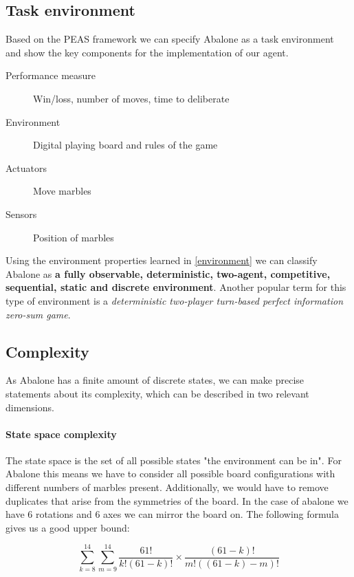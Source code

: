 \subsection{Task environment}
Based on the PEAS framework we can specify Abalone as a task environment and show the key components for the implementation of our agent. \cite[p.107]{russell_artificial_2021}

\begin{description}
    \item[Performance measure] Win/loss, number of moves, time to deliberate
    \item[Environment] Digital playing board and rules of the game
    \item[Actuators] Move marbles
    \item[Sensors] Position of marbles
\end{description}

Using the environment properties learned in \ref{environment} we can classify Abalone as \textbf{a fully observable, deterministic, two-agent, competitive, sequential, static and discrete environment}. Another popular term for this type of environment is a \textit{deterministic two-player  turn-based perfect information zero-sum game}.

\subsection{Complexity}
As Abalone has a finite amount of discrete states, we can make precise statements about its complexity, which can be described in two relevant dimensions.

\paragraph{State space complexity}
The state space is the set of all possible states "the environment can be in".\cite[p. 150]{russell_artificial_2021} For Abalone this means we have to consider all possible board configurations with different numbers of marbles present. Additionally, we would have to remove duplicates that arise from the symmetries of the board. In the case of abalone we have 6 rotations and 6 axes we can mirror the board on. The following formula gives us a good upper bound:

\begin{equation}
    \sum_{k=8}^{14}\sum_{m=9}^{14}\frac{61!}{k!(61-k)!}\times\frac{(61-k)!}{m!((61-k)-m)!}
\end{equation}

